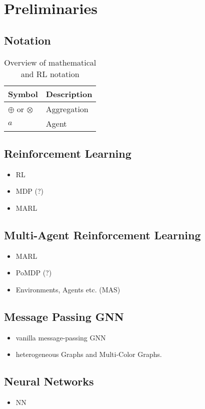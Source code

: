 
\chapter{Preliminaries}
\label{ch:Preliminaries}

\section{Notation}
\begin{table}[ht!]
	\caption{Overview of mathematical and RL notation}
	\vspace*{0.5cm}
	\centering
	\begin{tabular}{ll}
	\toprule
	Symbol & Description \\
	\midrule
	$\oplus$ or $\otimes$ & Aggregation \\
	\midrule
	$a$ & Agent \\
	\bottomrule
	\end{tabular}
	\label{tab:macros}
	\end{table}


\section{Reinforcement Learning}
\begin{itemize}[noitemsep,nolistsep]
	\item RL
	\item MDP (?)
	\item MARL
\end{itemize}

\section{Multi-Agent Reinforcement Learning}
\begin{itemize}[noitemsep,nolistsep]
	\item MARL
	\item PoMDP (?)
	\item Environments, Agents etc. (MAS)
\end{itemize}

\section{Message Passing GNN}
\begin{itemize}[noitemsep,nolistsep]
	\item vanilla message-passing GNN
	\item heterogeneous Graphs and Multi-Color Graphs.
\end{itemize}

\section{Neural Networks}
\begin{itemize}[noitemsep,nolistsep]
	\item NN
\end{itemize}